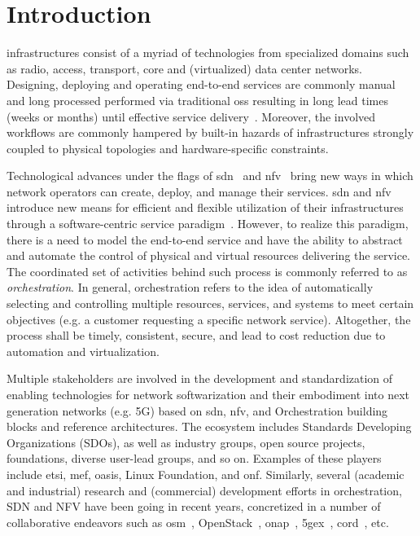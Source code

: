 \section{Introduction}

   infrastructures consist of a myriad of technologies from specialized domains such as radio,  access, transport, core and (virtualized) data center networks. Designing, deploying and operating end-to-end services are commonly   manual and long processed performed via traditional \gls{oss} resulting in long lead times (weeks or months) until effective service delivery~\cite{BluePlanet2017ProductsOrchestration}. Moreover, the involved workflows are commonly hampered by built-in hazards of infrastructures strongly coupled to physical topologies and hardware-specific constraints.

Technological advances under the flags of \gls{sdn}~\cite{surveySDN} and \gls{nfv}~\cite{Mijumbi2016NetworkChallenges} bring new ways in which network operators can create, deploy, and manage their services. \gls{sdn} and \gls{nfv} introduce new means for efficient and flexible utilization of their infrastructures through a software-centric service paradigm~\cite{Sonkoly2014UNIFYingView}. However, to realize this paradigm, there is a need to model the end-to-end service and have the ability to abstract and automate the control of physical and virtual resources delivering the service. The coordinated set of activities behind such process is commonly referred to as \textit{orchestration}. In general, orchestration refers to the idea of automatically selecting and controlling multiple resources, services, and systems to meet certain objectives (e.g. a customer requesting a specific network service). Altogether, the process shall be timely, consistent, secure, and lead to cost reduction due to automation and virtualization. 

Multiple stakeholders are involved in the development and standardization of enabling technologies for network softwarization and their embodiment into next generation networks (e.g. 5G) based on \gls{sdn}, \gls{nfv}, and Orchestration building blocks and reference architectures. The ecosystem includes Standards Developing Organizations (SDOs), as well as industry groups, open source projects, foundations, diverse user-lead groups, and so on. Examples of these players include \gls{etsi}, \gls{mef}, \gls{oasis}, Linux Foundation, and \gls{onf}. Similarly, several (academic and industrial) research and (commercial) development efforts in orchestration, SDN and NFV have been going in recent years, concretized in a number of collaborative endeavors such as \gls{osm}~\cite{ETSIOpenMANO}, OpenStack~\cite{Foundationb}, \gls{onap}~\cite{onap}, \gls{5gex}~\cite{Guerzoni2016}, \gls{cord}~\cite{ON.LABOpenCORD},  etc.

